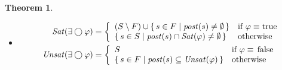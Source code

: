 \documentclass[12pt]{article}
\newcommand{\nxt}{\bigcirc}
\newcommand{\TRUE}{\mbox{\lstinline{true}}}
\newcommand{\FALSE}{\mbox{\lstinline{false}}}
\newtheorem{theorem}{Theorem}
\theoremstyle{definition}
\begin{document}
\begin{theorem}
\begin{itemize}
\item
\begin{align*}
\mathit{Sat}(\exists \nxt \varphi) & = \left \{
\begin{array}{ll}
(S \setminus F) \cup \{\, s \in F \mid \mathit{post}(s) \not= \emptyset \,\}
& \mbox{if $\varphi \equiv \TRUE$}\\
\{\, s \in S \mid \mathit{post}(s) \cap \mathit{Sat}(\varphi) \not= \emptyset \,\}
& \mbox{otherwise}
\end{array}
\right .
\\
\mathit{Unsat}(\exists \nxt \varphi) & = \left \{
\begin{array}{ll}
S & \mbox{if $\varphi \equiv \FALSE$}\\
\{\, s \in F \mid \mathit{post}(s) \subseteq \mathit{Unsat}(\varphi) \,\} & \mbox{otherwise}
\end{array}
\right .

\end{align*}
\end{itemize}
\end{theorem}
\end{document}

